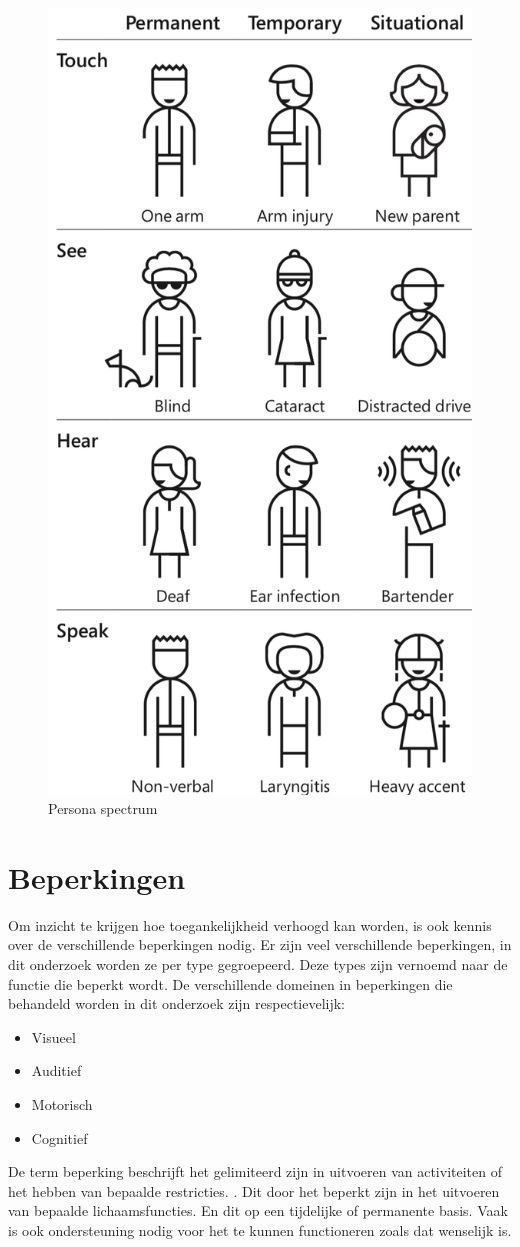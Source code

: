 \begin{figure}[h]
    \centering
    \includegraphics[width=0.4\linewidth]{img/doelgroep_situatie_tijdelijk}
    \caption{Persona spectrum \autocite{inclusiveMicrosoft}}
\end{figure}





\section{Beperkingen}
\label{sec:beperkingen}
Om inzicht te krijgen hoe toegankelijkheid verhoogd kan worden, is ook kennis over de verschillende beperkingen nodig. Er zijn veel verschillende beperkingen, in dit onderzoek worden ze per type gegroepeerd. Deze types zijn vernoemd naar de functie die beperkt wordt.
De verschillende domeinen in beperkingen die behandeld worden in dit onderzoek zijn respectievelijk: 
\begin{itemize}
    \item Visueel
    \item Auditief
     \item Motorisch
     \item Cognitief
    \end{itemize}


De term beperking beschrijft het gelimiteerd zijn in uitvoeren van activiteiten of het hebben van bepaalde restricties. \autocite{whoDis2019}. Dit door het beperkt zijn in het uitvoeren van bepaalde lichaamsfuncties. En dit op een tijdelijke of permanente basis. Vaak is ook ondersteuning nodig voor het te kunnen functioneren zoals dat wenselijk is.

